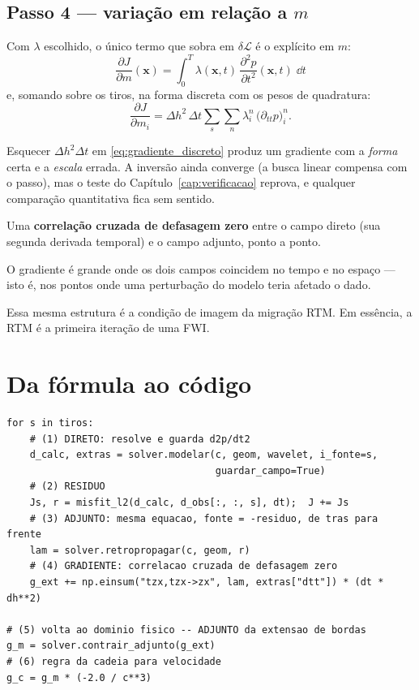 \documentclass[11pt,a4paper,oneside]{report}
\begin{document}
\subsection*{Passo 4 --- varia\c{c}\~ao em rela\c{c}\~ao a $m$}

Com $\lambda$ escolhido, o \'unico termo que sobra em $\delta\mathcal{L}$ \'e
o expl\'icito em $m$:
\begin{equation}
\boxed{\;
\frac{\partial J}{\partial m}(\mathbf{x})
 = \int_{0}^{T} \lambda(\mathbf{x},t)\,
   \frac{\partial^{2}p}{\partial t^{2}}(\mathbf{x},t)\; \dd t \;}
\label{eq:gradiente}
\end{equation}
e, somando sobre os tiros, na forma discreta com os pesos de quadratura:
\begin{equation}
\frac{\partial J}{\partial m_i}
 = \Delta h^{2}\,\Delta t \sum_{s}\sum_{n}
   \lambda_i^{n}\,\bigl(\partial_{tt}p\bigr)_i^{n}.
\label{eq:gradiente_discreto}
\end{equation}

\begin{armadilha}
Esquecer $\Delta h^{2}\Delta t$ em \eqref{eq:gradiente_discreto} produz um
gradiente com a \emph{forma} certa e a \emph{escala} errada. A invers\~ao
ainda converge (a busca linear compensa com o passo), mas o teste do
Cap\'itulo~\ref{cap:verificacao} reprova, e qualquer compara\c{c}\~ao
quantitativa fica sem sentido.
\end{armadilha}

\begin{pratica}
Uma \textbf{correla\c{c}\~ao cruzada de defasagem zero} entre o campo direto
(sua segunda derivada temporal) e o campo adjunto, ponto a ponto.

O gradiente \'e grande onde os dois campos coincidem no tempo e no
espa\c{c}o --- isto \'e, nos pontos onde uma perturba\c{c}\~ao do modelo teria
afetado o dado.

Essa mesma estrutura \'e a condi\c{c}\~ao de imagem da migra\c{c}\~ao RTM. Em
ess\^encia, a RTM \'e a primeira itera\c{c}\~ao de uma FWI.
\end{pratica}

\section{Da f\'ormula ao c\'odigo}

\begin{lstlisting}
for s in tiros:
    # (1) DIRETO: resolve e guarda d2p/dt2
    d_calc, extras = solver.modelar(c, geom, wavelet, i_fonte=s,
                                    guardar_campo=True)
    # (2) RESIDUO
    Js, r = misfit_l2(d_calc, d_obs[:, :, s], dt);  J += Js
    # (3) ADJUNTO: mesma equacao, fonte = -residuo, de tras para frente
    lam = solver.retropropagar(c, geom, r)
    # (4) GRADIENTE: correlacao cruzada de defasagem zero
    g_ext += np.einsum("tzx,tzx->zx", lam, extras["dtt"]) * (dt * dh**2)

# (5) volta ao dominio fisico -- ADJUNTO da extensao de bordas
g_m = solver.contrair_adjunto(g_ext)
# (6) regra da cadeia para velocidade
g_c = g_m * (-2.0 / c**3)
\end{lstlisting}
\end{document}
